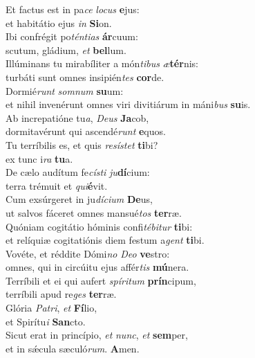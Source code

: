 \evenverse Et factus est in pa\textit{ce} \textit{lo}\textit{cus} \textbf{e}jus:~\*\\
\evenverse et habitátio ejus \textit{in} \textbf{Si}on.\\
\oddverse Ibi confrégit po\textit{tén}\textit{ti}\textit{as} \textbf{ár}cuum:~\*\\
\oddverse scutum, gládium, \textit{et} \textbf{bel}lum.\\
\evenverse Illúminans tu mirabíliter a món\textit{ti}\textit{bus} \textit{æ}\textbf{tér}nis:~\*\\
\evenverse turbáti sunt omnes insipién\textit{tes} \textbf{cor}de.\\
\oddverse Dormié\textit{runt} \textit{som}\textit{num} \textbf{su}um:~\*\\
\oddverse et nihil invenérunt omnes viri divitiárum in máni\textit{bus} \textbf{su}is.\\
\evenverse Ab increpatióne tu\textit{a}, \textit{De}\textit{us} \textbf{Ja}cob,~\*\\
\evenverse dormitavérunt qui ascendé\textit{runt} \textbf{e}quos.\\
\oddverse Tu terríbilis es, et quis \textit{re}\textit{sí}\textit{stet} \textbf{ti}bi?~\*\\
\oddverse ex tunc i\textit{ra} \textbf{tu}a.\\
\evenverse De cælo audítum fe\textit{cí}\textit{sti} \textit{ju}\textbf{dí}cium:~\*\\
\evenverse terra trémuit et \textit{qui}\textbf{é}vit.\\
\oddverse Cum exsúrgeret in ju\textit{dí}\textit{ci}\textit{um} \textbf{De}us,~\*\\
\oddverse ut salvos fáceret omnes mansué\textit{tos} \textbf{ter}ræ.\\
\evenverse Quóniam cogitátio hóminis confi\textit{té}\textit{bi}\textit{tur} \textbf{ti}bi:~\*\\
\evenverse et relíquiæ cogitatiónis diem festum a\textit{gent} \textbf{ti}bi.\\
\oddverse Vovéte, et réddite Dómi\textit{no} \textit{De}\textit{o} \textbf{ve}stro:~\*\\
\oddverse omnes, qui in circúitu ejus affér\textit{tis} \textbf{mú}nera.\\
\evenverse Terríbili et ei qui aufert \textit{spí}\textit{ri}\textit{tum} \textbf{prín}cipum,~\*\\
\evenverse terríbili apud re\textit{ges} \textbf{ter}ræ.\\
\oddverse Glória \textit{Pa}\textit{tri}, \textit{et} \textbf{Fí}lio,~\*\\
\oddverse et Spirítu\textit{i} \textbf{San}cto.\\
\evenverse Sicut erat in princípio, \textit{et} \textit{nunc}, \textit{et} \textbf{sem}per,~\*\\
\evenverse et in sǽcula sæculó\textit{rum}. \textbf{A}men.\\
